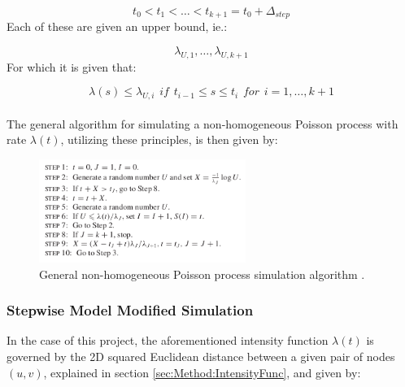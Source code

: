 \begin{equation}
    t_0 < t_1 < \dots < t_{k+1} = t_0 + \Delta_{step}
\end{equation}
Each of these are given an upper bound, ie.:

\begin{equation}
    \lambda_{U,1}, \dots, \lambda_{U,k+1}
\end{equation}
For which it is given that:

\begin{equation}
    \lambda(s) \leq \lambda_{U,i} \hspace{5pt} if \hspace{5pt} t_{i-1} \leq s \leq t_i \hspace{5pt} for \hspace{5pt} i = 1,\dots,k+1
\end{equation}
\\
The general algorithm for simulating a non-homogeneous Poisson process with rate $\lambda(t)$, utilizing these principles, is then given by:

\begin{figure}[H]
    \centering
    \includegraphics[width=0.6\textwidth]{0_images/nonHomogeneousAlgorithm.png}
    \caption{General non-homogeneous Poisson process simulation algorithm .}
    \label{fig:NonHomogeneousGeneralAlgorithm}
\end{figure}


\subsubsection{Stepwise Model Modified Simulation}
\label{sec:Method:PoissonSimulation:NonHomogeneousModified}
In the case of this project, the aforementioned intensity function $\lambda(t)$ is governed by the 2D squared Euclidean distance between a given pair of nodes $(u,v)$, explained in section \ref{sec:Method:IntensityFunc}, and given by:

